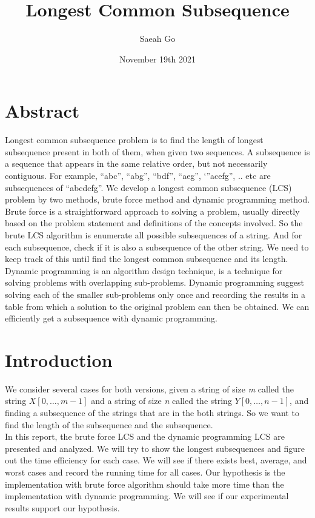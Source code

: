 \documentclass{article}
\title{\textbf{Longest Common Subsequence}}
\author{Saeah Go}
\date{November 19th 2021}
\begin{document}
\maketitle

\section{\textbf{Abstract}}
\indent \indent Longest common subsequence problem is to find the length of longest subsequence present in both of them, when given two sequences. A subsequence is a sequence that appears in the same relative order, but not necessarily contiguous. For example, “abc”, “abg”, “bdf”, “aeg”, ‘”acefg”, .. etc are subsequences of “abcdefg”. We develop a longest common subsequence (LCS) problem by two methods, brute force method and dynamic programming method. Brute force is a straightforward approach to solving a problem, usually directly based on the problem statement and definitions of the concepts involved. So the brute LCS algorithm is enumerate all possible subsequences of a string. And for each subsequence, check if it is also a subsequence of the other string. We need to keep track of this until find the longest common subsequence and its length. Dynamic programming is an algorithm design technique, is a technique for solving problems with overlapping sub-problems. Dynamic programming suggest solving each of the smaller sub-problems only once and recording the results in a table from which a solution to the original problem can then be obtained. We can efficiently get a subsequence with dynamic programming. 

\section{\textbf{Introduction}}
\indent \indent We consider several cases for both versions, given a string of size \textit{m} called the string $X[0, \ldots, m-1]$ and a string of size \textit{n} called the string $Y[0, \ldots, n-1]$, and finding a subsequence of the strings that are in the both strings. So we want to find the length of the subsequence and the subsequence. \\
\indent In this report, the brute force LCS and the dynamic programming LCS are presented and analyzed. We will try to show the longest subsequences and figure out the time efficiency for each case. We will see if there exists best, average, and worst cases and record the running time for all cases. Our hypothesis is the implementation with brute force algorithm should take more time than the implementation with dynamic programming. We will see if our experimental results support our hypothesis.
\end{document}
